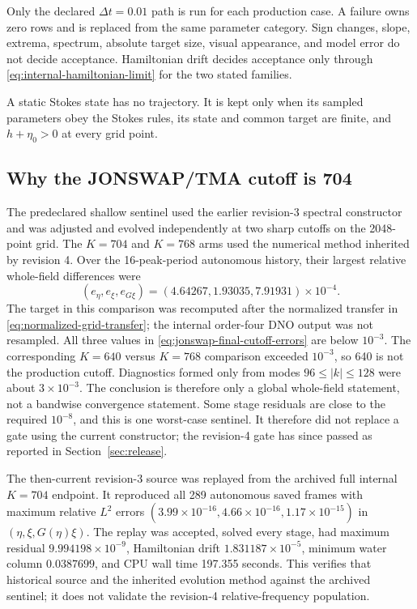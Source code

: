 \documentclass[10pt]{article}
\begin{document}
Only the declared $\Delta t=0.01$ path is run for each production case.  A
failure owns zero rows and is replaced from the same parameter category.
Sign changes, slope, extrema, spectrum, absolute target size, visual
appearance, and model error do not decide acceptance.  Hamiltonian drift
decides acceptance only through
\eqref{eq:internal-hamiltonian-limit} for the two stated families.

A static Stokes state has no trajectory.  It is kept only when its sampled
parameters obey the Stokes rules, its state and common target are finite, and
$h+\eta_0>0$ at every grid point.

\subsection{Why the JONSWAP/TMA cutoff is 704}

The predeclared shallow sentinel used the earlier revision-3 spectral
constructor and was adjusted and evolved independently at two sharp cutoffs
on the 2048-point grid.  The \(K=704\) and \(K=768\) arms used the numerical
method inherited by revision 4.  Over the 16-peak-period autonomous history,
their largest relative whole-field differences were
\begin{equation}
  (e_\eta,e_\xi,e_{G\xi})
  =(4.64267,1.93035,7.91931)\times10^{-4}.
  \label{eq:jonswap-final-cutoff-errors}
\end{equation}
The target in this comparison was recomputed after the normalized transfer in
\eqref{eq:normalized-grid-transfer}; the internal order-four DNO output was
not resampled.  All three values in
\eqref{eq:jonswap-final-cutoff-errors} are below \(10^{-3}\).  The corresponding
\(K=640\) versus \(K=768\) comparison exceeded \(10^{-3}\), so 640 is not the
production cutoff.  Diagnostics formed only from modes
\(96\le|k|\le128\) were about \(3\times10^{-3}\).  The conclusion is therefore
only a global whole-field statement, not a bandwise convergence statement.
Some stage residuals are close to the required \(10^{-8}\), and this is one
worst-case sentinel.  It therefore did not replace a gate using the current
constructor; the revision-4 gate has since passed as reported in
Section~\ref{sec:release}.

The then-current revision-3 source was replayed from the archived full internal
\(K=704\) endpoint.  It reproduced all 289 autonomous saved frames with
maximum relative \(L^2\) errors
\((3.99\times10^{-16},4.66\times10^{-16},1.17\times10^{-15})\) in
\((\eta,\xi,G(\eta)\xi)\).  The replay was accepted, solved every stage, had
maximum residual \(9.994198\times10^{-9}\), Hamiltonian drift
\(1.831187\times10^{-5}\), minimum water column \(0.0387699\), and CPU wall
time 197.355 seconds.  This verifies that historical source and the inherited
evolution method against the archived sentinel; it does not validate the
revision-4 relative-frequency population.
\end{document}
